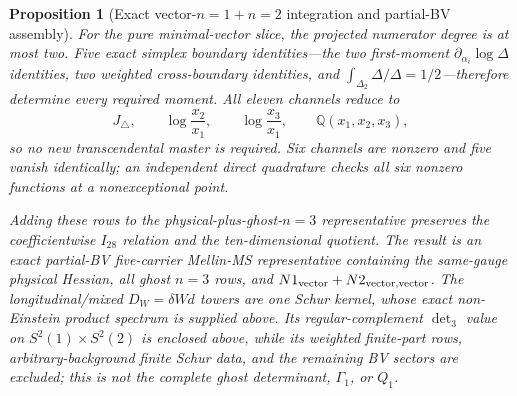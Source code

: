 \documentclass[11pt]{article}
\newtheorem{proposition}[theorem]{Proposition}
\theoremstyle{definition}
\theoremstyle{remark}
\begin{document}
\begin{proposition}[Exact vector-$n=1+n=2$ integration and partial-BV assembly]
For the pure minimal-vector slice, the projected numerator degree is at most
two.  Five exact simplex boundary identities---the two first-moment
$\partial_{\alpha_i}\log\Delta$ identities, two weighted cross-boundary
identities, and $\int_{\Delta_2}\Delta/\Delta=1/2$---therefore determine every
required moment.  All eleven channels reduce to
\[
 J_\triangle,\qquad \log\frac{x_2}{x_1},\qquad
 \log\frac{x_3}{x_1},\qquad \mathbb Q(x_1,x_2,x_3),
\]
so no new transcendental master is required.  Six channels are nonzero and
five vanish identically; an independent direct quadrature checks all six
nonzero functions at a nonexceptional point.

Adding these rows to the physical-plus-ghost-$n=3$ representative preserves
the coefficientwise $I_{28}$ relation and the ten-dimensional quotient.  The
result is an exact partial-BV five-carrier Mellin-MS representative containing
the same-gauge physical Hessian, all ghost $n=3$ rows, and
$N1_{\rm vector}+N2_{\rm vector,vector}$.  The longitudinal/mixed
$D_W=\delta Wd$ towers are one Schur kernel, whose exact non-Einstein product
spectrum is supplied above.  Its regular-complement $\det_3$ value on
$S^2(1)\times S^2(2)$ is enclosed above, while its weighted finite-part rows,
arbitrary-background finite Schur data, and the remaining BV sectors are
excluded; this is not the complete ghost determinant, $\Gamma_1$, or $Q_1$.
\end{proposition}
\end{document}
